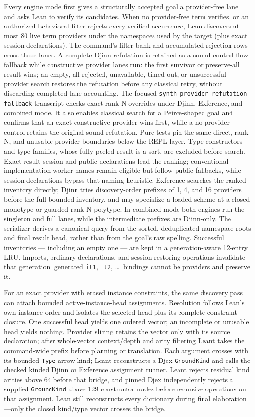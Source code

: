 \documentclass[11pt,oneside]{article}
\newcommand{\code}[1]{\texttt{#1}}
\begin{document}
Every engine mode first gives a structurally accepted goal a
provider-free lane and asks Lean to verify its candidates. When no
provider-free term verifies, or an authorized behavioral filter rejects every
verified occurrence, Lean discovers at most 80 live term providers under the
namespaces used by the target (plus exact session declarations). The command's
filter bank and accumulated rejection rows cross those lanes. A complete Djinn
refutation is retained as a sound control-flow fallback while constructive
provider lanes run: the first survivor or preserve-all result wins; an empty,
all-rejected, unavailable, timed-out, or unsuccessful provider search restores
the refutation before any classical retry, without discarding completed lane
accounting.
The focused \code{synth-provider-refutation-fallback} transcript checks exact
rank-N overrides under Djinn, Exference, and combined mode. It also enables
classical search for a Peirce-shaped goal and confirms that an exact
constructive provider wins first, while a no-provider control retains the
original sound refutation. Pure tests pin the same direct, rank-N, and
unusable-provider boundaries below the REPL layer.
Type constructors and type families, whose fully peeled result is a
sort, are excluded before search. Exact-result session and public
declarations lead the ranking;
conventional implementation-worker names remain eligible but follow
public fallbacks, while session declarations bypass that naming
heuristic. Exference searches the ranked inventory directly; Djinn
tries discovery-order prefixes of 1, 4, and 16 providers before the full
bounded inventory, and may specialize a loaded scheme at a closed
monotype or guarded rank-N polytype.  In combined mode both engines run
the singleton and full lanes, while the intermediate prefixes are
Djinn-only. The serializer derives a canonical
query from the
sorted, deduplicated namespace roots and final result head, rather than
from the goal's raw spelling. Successful inventories --- including an
empty one --- are kept in a generation-aware 12-entry LRU. Imports,
ordinary declarations, and session-restoring operations invalidate that
generation; generated \code{it1}, \code{it2}, \dots\ bindings cannot be
providers and preserve it.

For an exact provider with erased instance constraints, the same discovery
pass can attach bounded active-instance-head assignments. Resolution follows
Lean's own instance order and isolates the selected head plus its complete
constraint closure. One successful head yields one ordered vector; an
incomplete or unusable head yields nothing. Provider slicing retains the
vector only with its source declaration; after whole-vector context/depth and
arity filtering Leant takes the command-wide prefix before planning or
translation. Each argument crosses with its bounded \code{Type}-arrow kind;
Leant reconstructs a Djex \code{GroundKind} and calls the checked kinded Djinn
or Exference assignment runner. Leant rejects residual kind arities above 64
before that bridge, and pinned Djex independently rejects a supplied
\code{GroundKind} above 129 constructor nodes before recursive operations on
that assignment.
Lean still reconstructs every dictionary
during final elaboration---only the closed kind/type vector crosses the bridge.
\end{document}
